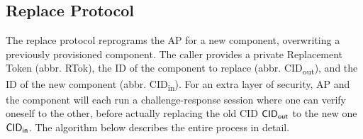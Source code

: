 \subsection{Replace Protocol}

The replace protocol reprograms the AP for a new component, overwriting a previously provisioned component. The caller provides a private Replacement Token (abbr. RTok), the ID of the component to replace (abbr. CID\textsubscript{out}), and the ID of the new component (abbr. CID\textsubscript{in}). For an extra layer of security, AP and the component will each run a challenge-response session where one can verify oneself to the other, before actually replacing the old CID $\mathsf{CID}_{\textsf{out}}$ to the new one $\mathsf{CID}_{\textsf{in}}$. The algorithm below describes the entire process in detail. 

\begin{pcimage}
\end{pcimage}

